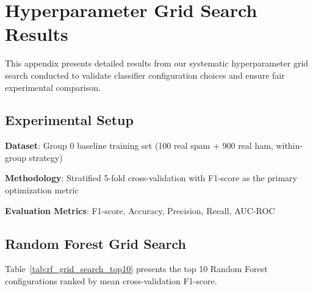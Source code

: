 
\section{Hyperparameter Grid Search Results}
\label{appendix:hyperparameter_grid_search}

This appendix presents detailed results from our systematic hyperparameter grid search conducted to validate classifier configuration choices and ensure fair experimental comparison.

\subsection{Experimental Setup}

\textbf{Dataset}: Group 0 baseline training set (100 real spam + 900 real ham, within-group strategy)

\textbf{Methodology}: Stratified 5-fold cross-validation with F1-score as the primary optimization metric

\textbf{Evaluation Metrics}: F1-score, Accuracy, Precision, Recall, AUC-ROC

\subsection{Random Forest Grid Search}

Table~\ref{tab:rf_grid_search_top10} presents the top 10 Random Forest configurations ranked by mean cross-validation F1-score.

